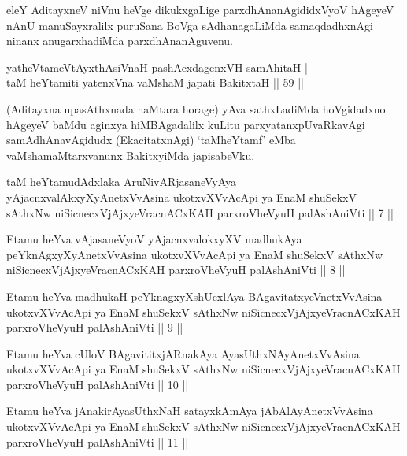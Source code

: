 \begin{artha}
eleY AditayxneV niVnu heVge dikukxgaLige parxdhAnanAgididxVyoV hAgeyeV 
nAnU manuSayxralilx puruSana BoVga sAdhanagaLiMda samaqdadhxnAgi 
ninanx anugarxhadiMda parxdhAnanAguvenu.
\end{artha}

\begin{shl}
yatheVtameVtAyxthA\s \s siVnaH pashAcxdagenxVH samAhitaH | \\
taM heYtamiti yatenxVna vaMshaM japati BakitxtaH \hfill|| 59 || 
\end{shl}

\begin{artha}
(Aditayxna upasAthxnada naMtara horage) yAva sathxLadiMda hoVgidadxno 
\break hAgeyeV baMdu aginxya hiMBAgadalilx kuLitu parxyatanxpUvaRkavAgi 
samAdhAna\-vAgidudx (EkacitatxnAgi) `taMheYtamf' eMba 
vaMshamaMtarxvanunx BakitxyiMda japisabeVku.
\end{artha}


\begin{shl}
taM heYtamudAdxlaka AruNivARjasaneVyAya yAjacnxvalAkxyXyAnetxVvAsina ukotxvXVvAcApi ya EnaM shuSekxV sAthxNw niSicnecxVjAjxyeVracnACxKAH parxroVheVyuH palAshAniVti || 7 ||
\end{shl}

\begin{shl}
Etamu heYva vAjasaneVyoV yAjacnxvalokxyXV madhukAya peYknAgxyXyAnetxVvAsina ukotxvXVvAcApi ya EnaM shuSekxV sAthxNw niSicnecxVjAjxyeVracnACxKAH parxroVheVyuH palAshAniVti || 8 ||
\end{shl}

\begin{shl}
Etamu heYva madhukaH peYknagxyXshUcxlAya BAgavitatxyeV\s netxVvAsina ukotxvXVvAcApi ya EnaM shuSekxV sAthxNw niSicnecxVjAjxyeVracnACxKAH parxroVheVyuH palAshAniVti || 9 ||
\end{shl}

\begin{shl}
Etamu heYva cUloV BAgavititxjARnakAya AyasUthxNAyAnetxVvAsina ukotxvXVvAcApi ya EnaM shuSekxV sAthxNw niSicnecxVjAjxyeVracnACxKAH parxroVheVyuH palAshAniVti || 10 ||
\end{shl}

\begin{shl}
Etamu heYva jAnakirAyasUthxNaH satayxkAmAya jAbAlAyAnetxVvAsina ukotxvXVvAcApi ya EnaM shuSekxV sAthxNw niSicnecxVjAjxyeVracnACxKAH parxroVheVyuH palAshAniVti || 11 ||
\end{shl}

